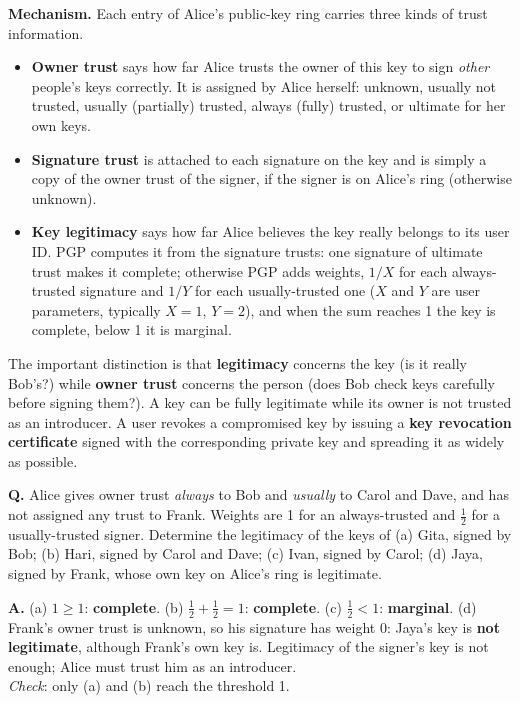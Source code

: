 \textbf{Mechanism.} Each entry of Alice's public-key ring carries three kinds of trust information.
\begin{itemize}
  \item \textbf{Owner trust} says how far Alice trusts the owner of this key to sign \emph{other} people's keys correctly. It is assigned by Alice herself: unknown, usually not trusted, usually (partially) trusted, always (fully) trusted, or ultimate for her own keys.
  \item \textbf{Signature trust} is attached to each signature on the key and is simply a copy of the owner trust of the signer, if the signer is on Alice's ring (otherwise unknown).
  \item \textbf{Key legitimacy} says how far Alice believes the key really belongs to its user ID. PGP computes it from the signature trusts: one signature of ultimate trust makes it complete; otherwise PGP adds weights, $1/X$ for each always-trusted signature and $1/Y$ for each usually-trusted one ($X$ and $Y$ are user parameters, typically $X = 1$, $Y = 2$), and when the sum reaches 1 the key is complete, below 1 it is marginal.
\end{itemize}
The important distinction is that \textbf{legitimacy} concerns the key (is it really Bob's?) while \textbf{owner trust} concerns the person (does Bob check keys carefully before signing them?). A key can be fully legitimate while its owner is not trusted as an introducer. A user revokes a compromised key by issuing a \textbf{key revocation certificate} signed with the corresponding private key and spreading it as widely as possible.

\begin{worked}
\textbf{Q.} Alice gives owner trust \emph{always} to Bob and \emph{usually} to Carol and Dave, and has not assigned any trust to Frank. Weights are 1 for an always-trusted and $\frac12$ for a usually-trusted signer. Determine the legitimacy of the keys of (a) Gita, signed by Bob; (b) Hari, signed by Carol and Dave; (c) Ivan, signed by Carol; (d) Jaya, signed by Frank, whose own key on Alice's ring is legitimate.

\textbf{A.} (a) $1 \ge 1$: \textbf{complete}. (b) $\frac12 + \frac12 = 1$: \textbf{complete}. (c) $\frac12 < 1$: \textbf{marginal}. (d) Frank's owner trust is unknown, so his signature has weight 0: Jaya's key is \textbf{not legitimate}, although Frank's own key is. Legitimacy of the signer's key is not enough; Alice must trust him as an introducer.\\
\emph{Check}: only (a) and (b) reach the threshold 1.
\end{worked}


